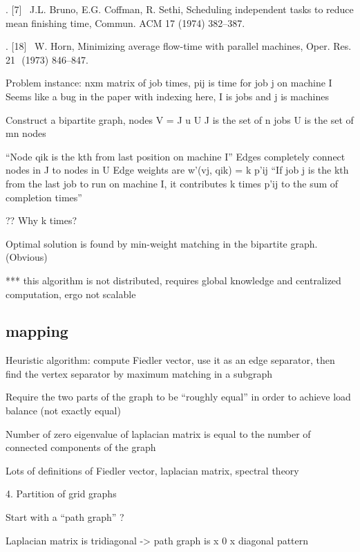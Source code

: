 \documentclass{article}
\begin{document}
	.	[7]  J.L. Bruno, E.G. Coffman, R. Sethi, Scheduling independent tasks to reduce mean finishing time, Commun. ACM 17 (1974) 382–387.

	.	[18]  W. Horn, Minimizing average flow-time with parallel machines, Oper. Res. 21  (1973) 846–847. 

Problem instance: nxm matrix of job times, pij is time for job j on machine I
Seems like a bug in the paper with indexing here, I is jobs and j is machines

Construct a bipartite graph, nodes V = J u U
J is the set of n jobs
U is the set of mn nodes

“Node qik is the kth from last position on machine I”
Edges completely connect nodes in J to nodes in U
Edge weights are w’(vj, qik) = k p’ij
“If job j is the kth from the last job to run on machine I, it contributes k times p’ij to the sum of completion times”

?? Why k times?

Optimal solution is found by min-weight matching in the bipartite graph.  (Obvious)

*** this algorithm is not distributed, requires global knowledge and centralized computation, ergo not scalable












\subsection{mapping}

\cite{doi:10.1137/0611030}


Heuristic algorithm: compute Fiedler vector, use it as an edge separator, then find the vertex separator by maximum matching in a subgraph

Require the two parts of the graph to be “roughly equal” in order to achieve load balance (not exactly equal)

Number of zero eigenvalue of laplacian matrix is equal to the number of connected components of the graph

Lots of definitions of Fiedler vector, laplacian matrix, spectral theory

4. Partition of grid graphs

Start with a “path graph” ?

Laplacian matrix is tridiagonal -> path graph is x 0 x diagonal pattern
\end{document}
